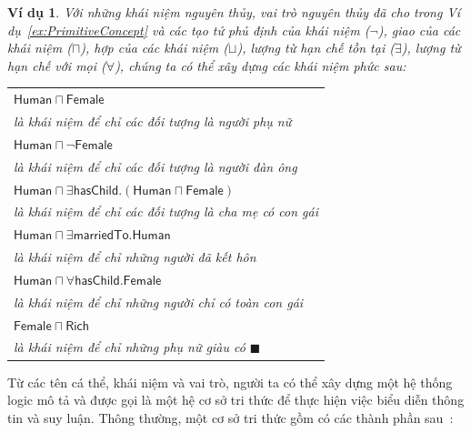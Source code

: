 \documentclass[12pt,a4paper]{report}
\newtheorem{Example}{Ví dụ}[chapter]
\newcommand{\myend}{\mbox{}\hfill\mbox{{\scriptsize$\!\blacksquare$}}}
\newcommand{\mand}{\sqcap}
\newcommand{\mor}{\sqcup}
\newcommand{\V}{\forall}
\newcommand{\E}{\exists}
\begin{document}
\begin{Example}
Với những khái niệm nguyên thủy, vai trò nguyên thủy đã cho trong Ví dụ~\ref{ex:PrimitiveConcept} và các tạo tử \textit{phủ định của khái niệm} ($\neg$), \textit{giao của các khái niệm} ($\mand$), \textit{hợp của các khái niệm} ($\mor$), \textit{lượng từ hạn chế tồn tại} ($\E$), \textit{lượng từ hạn chế với mọi} ($\V$), chúng ta có thể xây dựng các khái niệm phức sau:

  \begin{tabular}{l}
    $\mathsf{Human \mand Female}$\\
    \qquad là khái niệm để chỉ các đối tượng là người phụ nữ\\
    $\mathsf{Human \mand \neg Female}$\\
    \qquad là khái niệm để chỉ các đối tượng là người đàn ông\\
    $\mathsf{Human \mand \E hasChild.(Human \mand Female)}$\\
    \qquad là khái niệm để chỉ các đối tượng là cha mẹ có con gái\\
    $\mathsf{Human \mand \E marriedTo.Human}$\\
    \qquad là khái niệm để chỉ những người đã kết hôn\\ 
    $\mathsf{Human \mand \V hasChild.Female}$\\
    \qquad là khái niệm để chỉ những người chỉ có toàn con gái\\
    $\mathsf{Female \mand Rich}$\\
    \qquad là khái niệm để chỉ những phụ nữ giàu có \hspace{31.5ex} \myend
  \end{tabular}
\end{Example}

Từ các tên cá thể, khái niệm và vai trò, người ta có thể xây dựng một hệ thống logic mô tả và được gọi là một hệ cơ sở tri thức để thực hiện việc biểu diễn thông tin và suy luận. Thông thường, một cơ sở tri thức gồm có các thành phần sau~\cite{ref:Baader00}:
\end{document}
